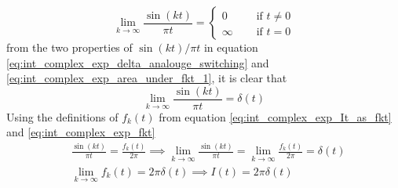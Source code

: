 \documentclass[11pt, a4paper]{article}
\begin{document}
\begin{equation}\label{eq:int_complex_exp_delta_analouge_switching}
	\lim \limits_{k \to \infty} \frac{\sin(kt)}{\pi t} = \left\{
	\begin{array}{ll}
		0  &  \quad \text{ if } t \neq 0 \\
		\infty & \quad \text{ if } t = 0
	\end{array}
	\right.
\end{equation}
from the two properties of $\sin(kt)/\pi t$ in equation \eqref{eq:int_complex_exp_delta_analouge_switching} and \eqref{eq:int_complex_exp_area_under_fkt_1}, it is clear that
\begin{equation*}
	\lim \limits_{k \to \infty} \frac{\sin(kt)}{\pi t} = \delta(t)
\end{equation*}
Using the definitions of $f_{k}(t)$ from equation \eqref{eq:int_complex_exp_It_as_fkt} and \eqref{eq:int_complex_exp_fkt}
\begin{align*}
	& \frac{\sin(kt)}{\pi t} = \frac{f_{k}(t)}{2\pi} \implies \lim \limits_{k \to \infty} \frac{\sin(kt)}{\pi t} = \lim \limits_{k \to \infty} \frac{f_{k}(t)}{2\pi} = \delta(t) \\
	& \lim \limits_{k \to \infty} f_{k}(t) = 2 \pi \delta(t) \implies \boxed{I(t) = 2 \pi \delta(t)}
\end{align*}



\end{document}

